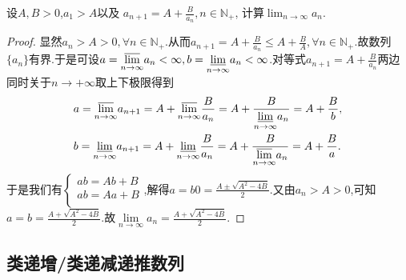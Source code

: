 \documentclass[lang=cn,newtx,10pt,scheme=chinese]{elegantbook}
\begin{document}
\begin{example}
   设\(A,B > 0\),\(a_1 > A\)以及
   \(a_{n + 1} = A + \frac{B}{a_n}, n \in \mathbb{N}_+\),
   计算\(\lim_{n \to \infty} a_n\).
   \end{example}
   \begin{proof}
   显然$a_n>A>0,\forall n\in\mathbb{N}_+$.从而$a_{n+1}=A+\frac{B}{a_n}\leq A+\frac{B}{A},\forall n\in\mathbb{N}_+$.故数列$\{a_n\}$有界.于是可设$a=\underset{n\rightarrow \infty}{{\varlimsup }}a_n<\infty,b=\underset{n\rightarrow \infty}{{\varliminf }}a_n<\infty$.对等式$a_{n + 1} = A + \frac{B}{a_n}$两边同时关于$n\to+\infty$取上下极限得到
   \begin{align*}
   &a=\underset{n\rightarrow \infty}{{\varlimsup }}a_{n+1}=A+\underset{n\rightarrow \infty}{{\varlimsup }}\frac{B}{a_n}=A+\frac{B}{\underset{n\rightarrow \infty}{{\varliminf }}a_n}=A+\frac{B}{b},
   \\
   &b=\underset{n\rightarrow \infty}{{\varliminf }}a_{n+1}=A+\underset{n\rightarrow \infty}{{\varliminf }}\frac{B}{a_n}=A+\frac{B}{\underset{n\rightarrow \infty}{{\varlimsup }}a_n}=A+\frac{B}{a}.
   \end{align*}
   于是我们有$\begin{cases}
      ab=Ab+B\\
      ab=Aa+B\\
   \end{cases}$,解得$a=b0=\frac{A\pm\sqrt{A^2-4B}}{2}$.又由$a_n>A>0$,可知$a=b=\frac{A+\sqrt{A^2-4B}}{2}$.故$\underset{n\rightarrow \infty}{\lim}a_n=\frac{A+\sqrt{A^2-4B}}{2}$.
\end{proof}


\subsection{类递增/类递减递推数列}
\end{document}
